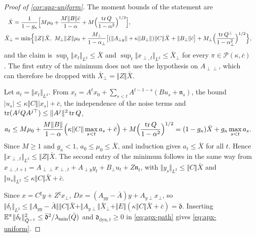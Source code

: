 \begin{proof}[Proof of \cref{cor:apx-uniform}]
The moment bounds of the statement are
\begin{equation}\label{eq:apx-moments}
\begin{aligned}
\bar X&=\frac{1}{1-g_\kappa}\Bigl[M\mu_0+\frac{M\Vert B\Vert\bar c}{1-\alpha}+M\Bigl(\frac{\operatorname{tr} Q}{1-\alpha^2}\Bigr)^{1/2}\Bigr],\\
\bar X_\perp&=\min\Bigl\{\Vert Z\Vert\bar X,\ M_\perp\Vert Z\Vert\mu_0+\frac{M_\perp}{1-\alpha_\perp}\bigl[(\Vert A_{\perp y}\Vert+\kappa\Vert B_\perp\Vert)\Vert C\Vert\bar X+\Vert B_\perp\Vert\bar c\bigr]+M_\perp\Bigl(\frac{\operatorname{tr} Q^\perp}{1-\alpha_\perp^2}\Bigr)^{1/2}\Bigr\},
\end{aligned}
\end{equation}
and the claim is $\sup_t\Vert x_t\Vert_{L^2}\le\bar X$ and $\sup_t\Vert x_{\perp,t}\Vert_{L^2}\le\bar X_\perp$ for every $\pi\in\mathcal P(\kappa,\bar c)$. The first entry of the minimum does not use the hypothesis on $A_{\perp\perp}$, which can therefore be dropped with $\bar X_\perp=\Vert Z\Vert\bar X$.

Let $a_t=\Vert x_t\Vert_{L^2}$. From $x_t=A^tx_0+\sum_{s<t}A^{t-1-s}(Bu_s+\mathfrak n_s)$, the bound $\lvert u_s\rvert\le\kappa\Vert C\Vert\lvert x_s\rvert+\bar c$, the independence of the noise terms and $\operatorname{tr}(A^jQA^{j\top})\le\Vert A^j\Vert^2\operatorname{tr} Q$,
\begin{equation*}
a_t\le M\mu_0+\frac{M\Vert B\Vert}{1-\alpha}\Bigl(\kappa\Vert C\Vert\max_{s<t}a_s+\bar c\Bigr)+M\Bigl(\frac{\operatorname{tr} Q}{1-\alpha^2}\Bigr)^{1/2}=(1-g_\kappa)\bar X+g_\kappa\max_{s<t}a_s .
\end{equation*}
Since $M\ge1$ and $g_\kappa<1$, $a_0\le\mu_0\le\bar X$, and induction gives $a_t\le\bar X$ for all $t$. Hence $\Vert x_{\perp,t}\Vert_{L^2}\le\Vert Z\Vert\bar X$. The second entry of the minimum follows in the same way from $x_{\perp,t+1}=A_{\perp\perp}x_{\perp,t}+A_{\perp y}y_t+B_\perp u_t+Z\mathfrak n_t$, with $\Vert y_s\Vert_{L^2}\le\Vert C\Vert\bar X$ and $\Vert u_s\Vert_{L^2}\le\kappa\Vert C\Vert\bar X+\bar c$.

Since $x=C^\sharp y+Z^\sharp x_\perp$, $Dx=(A_{yy}-\bar A)y+A_{y\perp}x_\perp$, so $\Vert\delta_t\Vert_{L^2}\le\Vert A_{yy}-\bar A\Vert\Vert C\Vert\bar X+\Vert A_{y\perp}\Vert\bar X_\perp+\Vert E\Vert(\kappa\Vert C\Vert\bar X+\bar c)=\bar{\mathfrak d}$. Inserting $\mathbb{E}^\pi\Vert\delta_t\Vert^2_{\bar Q^{-1}}\le\bar{\mathfrak d}^2/\lambda_{\min}(\bar Q)$ and $\mathfrak d_{\mathrm{dyn},t}\ge0$ in \cref{eq:apx-path} gives \cref{eq:apx-uniform}.
\end{proof}

